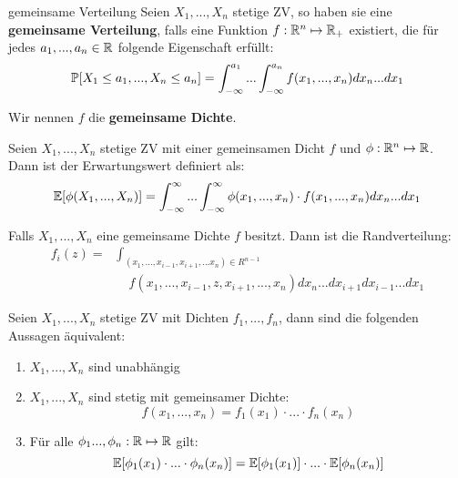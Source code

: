 \begin{mainbox}{gemeinsame Verteilung}
    Seien $X_1,...,X_n$ stetige ZV, so haben sie eine \textbf{gemeinsame Verteilung}, falls eine Funktion $f: \mathbb{R}^n \mapsto \mathbb{R}_+$ existiert, die für jedes $a_1,...,a_n \in \mathbb{R}$ folgende Eigenschaft erfüllt:
    $$\mathbb{P}[X_1 \leq a_1,..., X_n \leq a_n] = \int_{-\infty}^{a_1} ... \int_{-\infty}^{a_n} f(x_1,..., x_n) dx_n ... dx_1$$
    
    Wir nennen $f$ die \textbf{gemeinsame Dichte}.
\end{mainbox}

\begin{subbox}{} Seien $X_1,...,X_n$ stetige ZV mit einer gemeinsamen Dicht $f$ und $\phi: \mathbb{R}^n \mapsto \mathbb{R}$. Dann ist der Erwartungswert definiert als:
$$\mathbb{E}[\phi(X_1, ..., X_n)] = \int_{-\infty}^\infty ... \int_{-\infty}^\infty \phi(x_1, ...,x_n) \cdot f(x_1,...,x_n) dx_n...dx_1$$
\end{subbox}
\begin{subbox}{} Falls $X_1,...,X_n$ eine gemeinsame Dichte $f$ besitzt. Dann ist die Randverteilung:
\begin{align*}
    f_i(z) =& \int_{(x_1, ..., x_{i-1},x_{i+1},...x_n) \in R^{n-1}} \\ 
    & \quad f(x_1,...,x_{i-1},z,x_{i+1},...,x_n)dx_n...dx_{i+1}dx_{i-1}...dx_1
\end{align*}
\end{subbox}
\begin{subbox}{} Seien $X_1,...,X_n$ stetige ZV mit Dichten $f_1,..., f_n$, dann sind die folgenden Aussagen äquivalent:
\begin{enumerate}
    \item $X_1,...,X_n$ sind unabhängig
    
    \item $X_1,...,X_n$ sind stetig mit gemeinsamer Dichte: 
    $$f(x_1,...,x_n) = f_1(x_1) \cdot ... \cdot f_n(x_n)$$
    
    \item Für alle $\phi_1...,\phi_n : \mathbb{R} \mapsto \mathbb{R}$ gilt:
    $$\mathbb{E}[\phi_1(x_1) \cdot ... \cdot \phi_n(x_n)] = \mathbb{E}[\phi_1(x_1)] \cdot ... \cdot \mathbb{E}[\phi_n(x_n)]$$
\end{enumerate}\end{subbox}